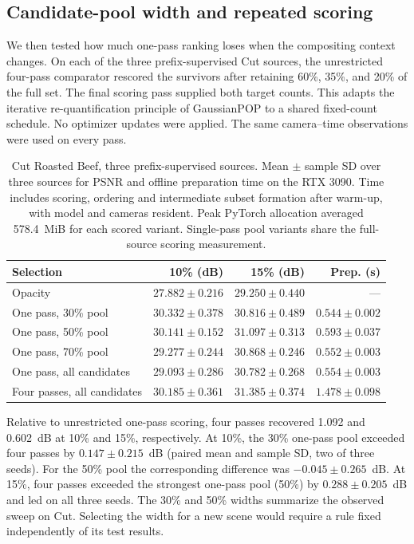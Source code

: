 \subsection{Candidate-pool width and repeated scoring}\label{sec:reschedule}
We then tested how much one-pass ranking loses when the compositing context changes. On each of the three prefix-supervised Cut sources, the unrestricted four-pass comparator rescored the survivors after retaining 60\%, 35\%, and 20\% of the full set. The final scoring pass supplied both target counts. This adapts the iterative re-quantification principle of GaussianPOP to a shared fixed-count schedule. No optimizer updates were applied. The same camera--time observations were used on every pass.
\begin{table}[!htbp]\centering\small
\caption{Cut Roasted Beef, three prefix-supervised sources. Mean $\pm$ sample SD over three sources for PSNR and offline preparation time on the RTX 3090. Time includes scoring, ordering and intermediate subset formation after warm-up, with model and cameras resident. Peak PyTorch allocation averaged 578.4~MiB for each scored variant. Single-pass pool variants share the full-source scoring measurement.}\label{tab:rescore}
\begin{tabular}{lrrr}\toprule
Selection & 10\% (dB) & 15\% (dB) & Prep. (s) \\\midrule
Opacity & $27.882\pm0.216$ & $29.250\pm0.440$ & --- \\
One pass, 30\% pool & $30.332\pm0.378$ & $30.816\pm0.489$ & $0.544\pm0.002$ \\
One pass, 50\% pool & $30.141\pm0.152$ & $31.097\pm0.313$ & $0.593\pm0.037$ \\
One pass, 70\% pool & $29.277\pm0.244$ & $30.868\pm0.246$ & $0.552\pm0.003$ \\
One pass, all candidates & $29.093\pm0.286$ & $30.782\pm0.268$ & $0.554\pm0.003$ \\
Four passes, all candidates & $30.185\pm0.361$ & $31.385\pm0.374$ & $1.478\pm0.098$ \\
\bottomrule\end{tabular}\end{table}
Relative to unrestricted one-pass scoring, four passes recovered 1.092 and 0.602~dB at 10\% and 15\%, respectively. At 10\%, the 30\% one-pass pool exceeded four passes by $0.147\pm0.215$~dB (paired mean and sample SD, two of three seeds). For the 50\% pool the corresponding difference was $-0.045\pm0.265$~dB. At 15\%, four passes exceeded the strongest one-pass pool (50\%) by $0.288\pm0.205$~dB and led on all three seeds. The 30\% and 50\% widths summarize the observed sweep on Cut. Selecting the width for a new scene would require a rule fixed independently of its test results.


